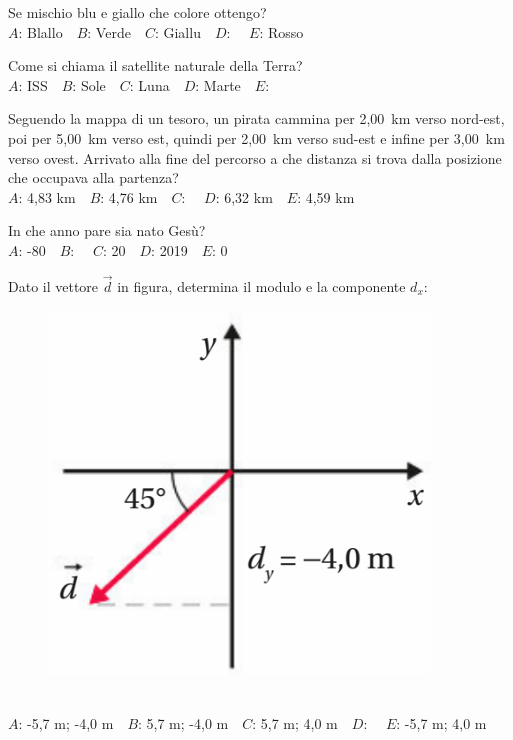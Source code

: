 \def\mcquestionnumber{4}


\mcquestionheader Se mischio blu e giallo che colore ottengo?\\
{$A$}: Blallo\ \ {$B$}: Verde\ \ {$C$}: Giallu\ \ {$D$}: \ \ {$E$}: Rosso\ \ 

\mcquestionfooter



\def\mcquestionnumber{5}


\mcquestionheader Come si chiama il satellite naturale della Terra?\\
{$A$}: ISS\ \ {$B$}: Sole\ \ {$C$}: Luna\ \ {$D$}: Marte\ \ {$E$}: \ \ 

\mcquestionfooter



\def\mcquestionnumber{6}


\mcquestionheader Seguendo la mappa di un tesoro, un pirata cammina per 2,00~km verso nord-est, poi per 5,00~km verso est, quindi per 2,00~km verso sud-est e infine per 3,00~km verso ovest. Arrivato alla fine del percorso a che distanza si trova dalla posizione che occupava alla partenza?\\
{$A$}: 4,83 km\ \ {$B$}: 4,76 km\ \ {$C$}: \ \ {$D$}: 6,32 km\ \ {$E$}: 4,59 km\ \ 

\mcquestionfooter



\def\mcquestionnumber{7}


\mcquestionheader In che anno pare sia nato Gesù?\\
{$A$}: -80\ \ {$B$}: \ \ {$C$}: 20\ \ {$D$}: 2019\ \ {$E$}: 0\ \ 

\mcquestionfooter



\def\mcquestionnumber{8}


\mcquestionheader Dato il vettore $\vec{d}$ in figura, determina il modulo e la componente $d_x$: \begin{figure}[h!]   \begin{center}     \includegraphics[scale=0.35]{vettored.png}   \end{center} \end{figure}\\
{$A$}: -5,7 m; -4,0 m\ \ {$B$}: 5,7 m; -4,0 m\ \ {$C$}: 5,7 m; 4,0 m\ \ {$D$}: \ \ {$E$}: -5,7 m; 4,0 m\ \ 

